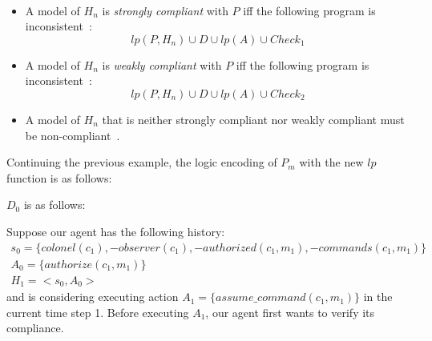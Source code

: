 \begin{definition}
    \label{def:authorization_event_compliance_history_knowledge}
    ~

    \begin{itemize}
        \item A model of $H_n$ is \textit{strongly compliant} with $P$ iff the following program is inconsistent~\citep{gelfond_authorization_2008}:
            \begin{equation}
                \label{eq:authorization_history_knowledge_strongly_compliant}
                lp(P, H_n) \cup D \cup lp(A) \cup Check_1
            \end{equation}
        \item A model of $H_n$ is \textit{weakly compliant} with $P$ iff the following program is inconsistent~\citep{gelfond_authorization_2008}:
            \begin{equation}
                \label{eq:authorization_history_knowledge_weakly_compliant}
                lp(P, H_n) \cup D \cup lp(A) \cup Check_2
            \end{equation}
        \item A model of $H_n$ that is neither strongly compliant nor weakly compliant must be non-compliant~\citep{gelfond_authorization_2008}.
    \end{itemize}
\end{definition}

Continuing the previous example, the logic encoding of $P_m$ with the new $lp$ function is as follows:


$D_0$ is as follows:


Suppose our agent has the following history\footnotemark:
\begin{gather}
    s_0 = \{ colonel(c_1), -observer(c_1), -authorized(c_1, m_1), -commands(c_1, m_1) \} \\
    A_0 = \{ authorize(c_1, m_1) \} \\
    H_1 = < s_0, A_0 >
\end{gather}
and is considering executing action $A_1 = \{ assume\_command(c_1, m_1) \}$ in the current time step 1.
Before executing $A_1$, our agent first wants to verify its compliance.


